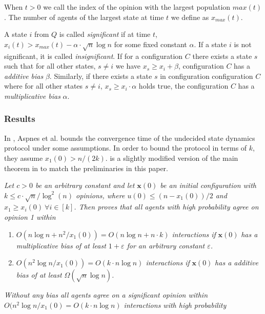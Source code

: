 When $t > 0$ we call the index of the opinion with the largest population $max(t)$. The number of agents of the largest state at time $t$ we define as $x_{max}(t)$. 

A state $i$ from $Q$ is called \emph{significant} if at time $t$, $x_i(t) > x_{max}(t) - \alpha \cdot \sqrt{n} \log n$ for some fixed constant $\alpha$. If a state $i$ is not significant, it is called \emph{insignificant}. If for a configuration $C$ there exists a state $s$ such that for all other states, $s \neq i$ we have $x_s \geq x_i + \beta$, configuration $C$ has a \emph{additive bias} $\beta$. Similarly, if there exists a state $s$ in configuration configuration $C$ where for all other states $s \neq i$, 
$x_s \geq x_i \cdot \alpha$ holds true, the configuration $C$ has a \emph{multiplicative bias} $\alpha$. 

\subsubsection{Results}

In \cite{AspnesFastConverganceOfKOpinion2023}, Aspnes et al. bounds the convergence time of the undecided state dynamics protocol under some assumptions. In order to bound the protocol in terms of $k$, they assume $x_1(0) > n/(2k)$.  is a slightly modified version of the main theorem in \cite{AspnesFastConverganceOfKOpinion2023} to match the preliminaries in this paper.

 \begin{theorem}
    \textit{Let $c > 0$ be an arbitrary constant and let $\textbf{x}(0)$ be an initial configuration with $k \leq c \cdot \sqrt{n}/\log^2(n) $ opinions, where $u(0) \leq (n - x_1(0))/2$ and $x_1 \geq x_i(0) \ \forall i \in [k]$. Then \cite{AspnesFastConverganceOfKOpinion2023} proves that all agents with high probability agree on opinion 1 within}

    \begin{enumerate}
        \item \textit{$O(n \log n + n^2 / x_1(0)) = O(n \log n + n \cdot k)$ interactions if }$\textbf{x}(0)$ \textit{has a multiplicative bias  of at least $1 + \varepsilon$ for an arbitrary constant $\varepsilon$.} \label{theorem5_1}
        \item \textit{$O(n^2 \log n/x_1(0)) = O(k \cdot n \log n)$ interactions if} $\textbf{x}(0)$ \textit{has a additive bias  of at least $\Omega(\sqrt{n} \log n)$.} \label{theorem5_2}
    \end{enumerate}

    \textit{Without any bias all agents agree on a significant opinion within $O(n^2 \log n / x_1(0) = O(k \cdot n \log n)$ interactions with high probability}
 \end{theorem} 

